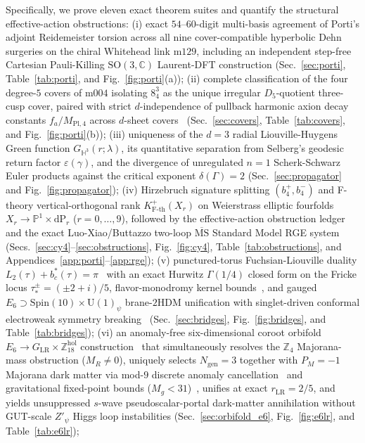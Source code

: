 \documentclass[aps,prd,twocolumn,nofootinbib,floatfix]{revtex4-2}
\begin{document}
Specifically, we prove eleven exact theorem suites and quantify the structural effective-action obstructions:
(i) exact $54$--$60$-digit multi-basis agreement of Porti's adjoint Reidemeister torsion across all nine cover-compatible hyperbolic Dehn surgeries on the chiral Whitehead link $\mathrm{m129}$, including an independent step-free Cartesian Pauli-Killing $\mathrm{SO}(3,\mathbb{C})$ Laurent-DFT construction (Sec.~\ref{sec:porti}, Table~\ref{tab:porti}, and Fig.~\ref{fig:porti}(a));
(ii) complete classification of the four degree-$5$ covers of $\mathrm{m004}$ isolating $8^3_4$ as the unique irregular $D_5$-quotient three-cusp cover, paired with strict $d$-independence of pullback harmonic axion decay constants $f_a/M_{\mathrm{Pl},4}$ across $d$-sheet covers~\cite{Srednicki1985,SvrcekWitten2006} (Sec.~\ref{sec:covers}, Table~\ref{tab:covers}, and Fig.~\ref{fig:porti}(b));
(iii) uniqueness of the $d=3$ radial Liouville-Huygens Green function $G_{\mathbb{H}^3}(r;\lambda)$, its quantitative separation from Selberg's geodesic return factor $\varepsilon(\gamma)$, and the divergence of unregulated $n=1$ Scherk-Schwarz Euler products against the critical exponent $\delta(\Gamma) = 2$ (Sec.~\ref{sec:propagator} and Fig.~\ref{fig:propagator});
(iv) Hirzebruch signature splitting $(b_4^+, b_4^-)$ and F-theory vertical-orthogonal rank $K_{\mathrm{F\text{-}th}}^+(X_r)$ on Weierstrass elliptic fourfolds $X_r \to \mathbb{P}^1\times\mathrm{dP}_r$ ($r=0,\dots,9$), followed by the effective-action obstruction ledger and the exact Luo-Xiao/Buttazzo two-loop $\overline{\mathrm{MS}}$ Standard Model RGE system (Secs.~\ref{sec:cy4}--\ref{sec:obstructions}, Fig.~\ref{fig:cy4}, Table~\ref{tab:obstructions}, and Appendices~\ref{app:porti}--\ref{app:rge});
(v) punctured-torus Fuchsian-Liouville duality $L_2(\tau) + b_c^*(\tau) = \pi$~\cite{KeenRauchVasquez1979,KrausRothSugawa2011} with an exact Hurwitz $\Gamma(1/4)$ closed form on the Fricke locus $\tau_*^\pm = (\pm 2+i)/5$, flavor-monodromy kernel bounds~\cite{GeorgiJarlskog1979}, and gauged $E_6 \supset \mathrm{Spin}(10)\times\mathrm{U}(1)_\psi$ brane-$2\mathrm{HDM}$ unification with singlet-driven conformal electroweak symmetry breaking~\cite{MohapatraMarshak1980,Kannike2012} (Sec.~\ref{sec:bridges}, Fig.~\ref{fig:bridges}, and Table~\ref{tab:bridges});
(vi) an anomaly-free six-dimensional coroot orbifold $E_6 \to G_{\mathrm{LR}} \times \mathbb{Z}_{18}^{\mathrm{hol}}$ construction~\cite{Kawamura2001,SenjanovicMohapatra1975} that simultaneously resolves the $\mathbb{Z}_4$ Majorana-mass obstruction ($M_R \ne 0$), uniquely selects $N_{\mathrm{gen}} = 3$ together with $P_M = -1$ Majorana dark matter via mod-$9$ discrete anomaly cancellation~\cite{IbanezRoss1991,DreinerLuhnThormeier2006} and gravitational fixed-point bounds ($M_g < 31$)~\cite{DonaEichhornPercacci2014}, unifies at exact $r_{\mathrm{LR}} = 2/5$, and yields unsuppressed $s$-wave pseudoscalar-portal dark-matter annihilation without GUT-scale $Z'_\psi$ Higgs loop instabilities (Sec.~\ref{sec:orbifold_e6}, Fig.~\ref{fig:e6lr}, and Table~\ref{tab:e6lr});
\end{document}
